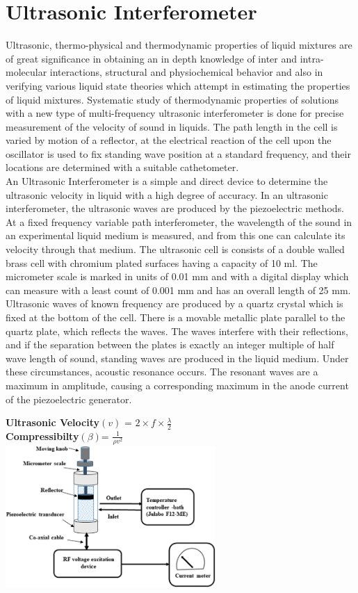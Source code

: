 \section{\label{sec:intro_res_quest}Ultrasonic Interferometer}
Ultrasonic, thermo-physical and thermodynamic properties of liquid mixtures are of great
significance in obtaining an in depth knowledge of inter and intra-molecular interactions,
structural and physiochemical behavior and also in verifying various liquid state theories
which attempt in estimating the properties of liquid mixtures. Systematic study of
thermodynamic properties of solutions with a new type of multi-frequency ultrasonic
interferometer is done for precise measurement of the velocity of sound in liquids. The path
length in the cell is varied by motion of a reflector, at the electrical reaction of the cell upon
the oscillator is used to fix standing wave position at a standard frequency, and their
locations are determined with a suitable cathetometer.\\
An Ultrasonic Interferometer is a simple and direct device to determine the ultrasonic velocity in liquid with a high degree of accuracy. In an ultrasonic interferometer, the ultrasonic waves are
produced by the piezoelectric methods. At a fixed frequency variable path interferometer, the wavelength of the sound in an experimental liquid medium is measured, and from this one can calculate its velocity through that medium. The ultrasonic cell is consists of a double walled brass cell with
chromium plated surfaces having a capacity of 10 ml. The
micrometer scale is marked in units of 0.01 mm and with a digital display which can measure with a least count of 0.001 mm and has an
overall length of 25 mm. Ultrasonic waves of known
frequency are produced by a quartz crystal which is fixed at
the bottom of the cell. There is a movable metallic plate
parallel to the quartz plate, which reflects the waves. The
waves interfere with their reflections, and if the separation
between the plates is exactly an integer multiple of half wave
length of sound, standing waves are produced in the liquid
medium. Under these circumstances, acoustic resonance
occurs. The resonant waves are a maximum in amplitude,
causing a corresponding maximum in the anode current of
the piezoelectric generator.
\begin{center}
\textbf{Ultrasonic Velocity}$(v)$ = $2\times f \times \frac{\lambda}{2}$ \\
\textbf{Compressibilty}$(\beta)$= $\frac{1}{\rho v^2}$ \\  
\vspace{5mm}
\includegraphics[width=80mm]{ultrasonic images/Ultrasonic.png}
\end{center}


